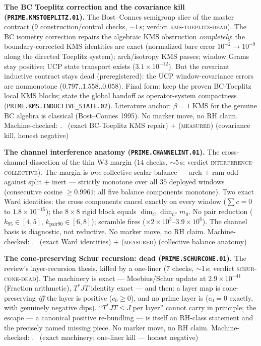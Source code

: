 \documentclass[11pt,a4paper]{article}
\theoremstyle{definition}
\begin{document}
\par\smallskip\noindent\textbf{The BC Toeplitz correction and the
covariance kill (\texttt{PRIME.KMSTOEPLITZ.01}).}
The Bost--Connes semigroup slice of the master contract ($9$
construction/control checks, ${\sim}1$\,s; verdict
\textsc{kms-toeplitz-dead}).  The BC isometry correction repairs
the algebraic KMS obstruction \emph{completely}: the
boundary-corrected KMS identities are exact (normalized bare error
$10^{-2}\to10^{-9}$ along the directed Toeplitz system);
arch/isotropy KMS passes; window Grams stay positive; UCP state
transport exists ($3.1\times10^{-12}$).  But the covariant
inductive contract stays dead (preregistered): the UCP
window-covariance errors are nonmonotone ($0.797..1.558..0.058$).
Final form: keep the proven BC-Toeplitz local KMS blocks; state the
global handoff as operator-system compactness
(\texttt{PRIME.KMS.INDUCTIVE\_STATE.02}).  Literature anchor:
$\beta=1$ KMS for the genuine BC algebra is classical
(Bost--Connes 1995).  No marker move, no RH claim.
Machine-checked: .
\mE\ (exact BC-Toeplitz KMS repair) $+$ (\textsc{measured})
(covariance kill, honest negative)
\par\smallskip

\par\smallskip\noindent\textbf{The channel interference anatomy
(\texttt{PRIME.CHANNELINT.01}).}
The cross-channel dissection of the thin W3 margin ($14$ checks,
${\sim}5$\,s; verdict \textsc{interference-collective}).  The
margin is \emph{one} collective scalar balance --- arch $+$ ram-odd
against split $+$ inert --- strictly monotone over all $35$
deployed windows (consecutive cosine $\ge0.9961$; all five balance
components monotone).  Two exact Ward identities: the cross
components cancel exactly on every window ($\sum c=0$ to
$1.8\times10^{-15}$); the $8\times8$ rigid block equals
$\dim_C\dim_{C'}m_0$.  No pair reduction ($k_{95}\in[4,5]$,
$k_{\mathrm{pair}90}\in[6,8]$); scramble fires
($\times2\times10^3$--$3.9\times10^6$).  The channel basis is
diagnostic, not reductive.  No marker move, no RH claim.
Machine-checked: .
\mE\ (exact Ward identities) $+$ (\textsc{measured}) (collective
balance anatomy)
\par\smallskip

\par\smallskip\noindent\textbf{The cone-preserving Schur recursion:
dead (\texttt{PRIME.SCHURCONE.01}).}
The review's layer-recursion thesis, killed by a one-liner ($7$
checks, ${\sim}1$\,s; verdict \textsc{schur-cone-dead}).  The
machinery is exact --- Moebius/Schur update at $2.9\times10^{-41}$
(Fraction arithmetic), $T^*JT$ identity exact --- and then: a layer
map is cone-preserving \emph{iff} the layer is positive
($c_0\ge0$), and no prime layer is ($c_0=0$ exactly, with genuinely
negative dips).  ``$T^*JT\le J$ per layer'' cannot carry in
principle; the escape --- a canonical positive re-bundling --- is
itself an RH-class statement and the precisely named missing piece.
No marker move, no RH claim.
Machine-checked: .
\mE\ (exact machinery; one-liner kill --- honest negative)
\par\smallskip
\end{document}
